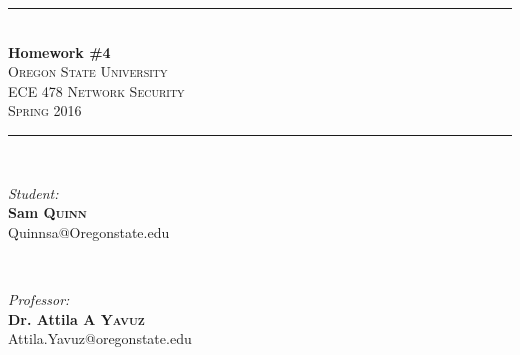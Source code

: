 \documentclass[letterpaper,11pt,notitlepage,fleqn]{article}
\begin{document}
\begin{titlepage}
    \vspace*{\fill}

    \newcommand{\HRule}{\rule{\linewidth}{0.5mm}} %

    \center %


    \HRule \\[0.4cm]
    { \huge \bfseries Homework \#4}\\[0.4cm] %


    \textsc{\LARGE Oregon State University}\\[0.5cm] %
    \textsc{\Large ECE 478 Network Security}\\[0.5cm] %
    \textsc{\large Spring 2016}\\[0.5cm] %


    \HRule \\[1.5cm]

    \begin{minipage}{0.4\textwidth}
        \begin{flushleft} \large
            \emph{Student:}\\
            \noindent \textbf{Sam \textsc{Quinn}} \\ %
            {\small Quinnsa@Oregonstate.edu}
        \end{flushleft}
    \end{minipage}
        ~
        \begin{minipage}{0.4\textwidth}
            \begin{flushright} \large
                \emph{Professor:} \\
                \noindent \textbf{Dr. Attila A \textsc{Yavuz}} \\ %
                {\small Attila.Yavuz@oregonstate.edu}
            \end{flushright}
        \end{minipage}\\[3cm]


\end{titlepage}
\end{document}
